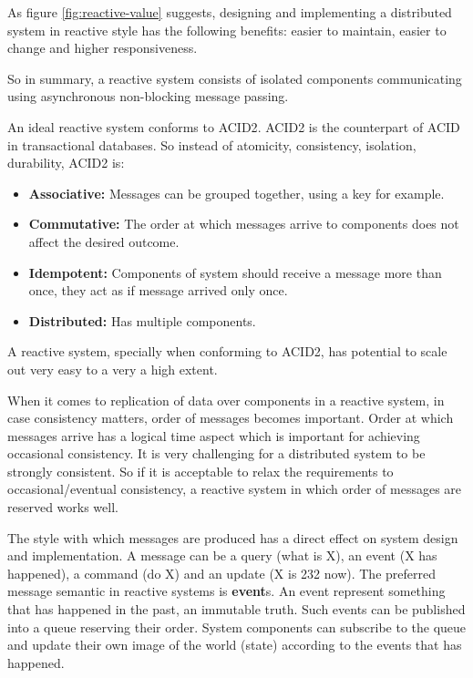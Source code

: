 \documentclass[a4]{report}
\begin{document}
    As figure \ref{fig:reactive-value} suggests, designing and implementing a distributed system in reactive style
    has the following benefits: easier to maintain, easier to change and higher responsiveness.

    So in summary, a reactive system consists of isolated components communicating using asynchronous non-blocking message passing.

    An ideal reactive system conforms to ACID2\cite{reactive-microsystems}.
    ACID2 is the counterpart of ACID in transactional databases.
    So instead of atomicity, consistency, isolation, durability, ACID2 is:
    \begin{itemize}
        \item \textbf{Associative:} Messages can be grouped together, using a key for example.
        \item \textbf{Commutative:} The order at which messages arrive to components does not affect the desired
        outcome.
        \item \textbf{Idempotent:} Components of system should receive a message more than once, they act as if message arrived only once.
        \item \textbf{Distributed:} Has multiple components.
    \end{itemize}

    A reactive system, specially when conforming to ACID2, has potential to scale out very easy to a very a high extent.

    When it comes to replication of data over components in a reactive system, in case consistency matters, order of
    messages becomes important.
    Order at which messages arrive has a logical time aspect which is important for achieving occasional consistency.
    It is very challenging for a distributed system to be strongly consistent.
    So if it is acceptable to relax the requirements to occasional/eventual consistency, a reactive system in which
    order of messages are reserved works well.

    The style with which messages are produced has a direct effect on system design and implementation.
    A message can be a query (what is X), an event (X has happened), a command (do X) and an update (X is 232 now).
    The preferred message semantic in reactive systems is \textbf{event}s.
    An event represent something that has happened in the past, an immutable truth.
    Such events can be published into a queue reserving their order.
    System components can subscribe to the queue and update their own image of the world (state) according to the
    events that has happened.
\end{document}
